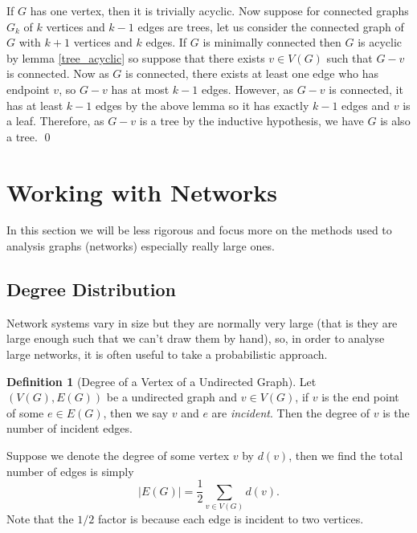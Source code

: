 \documentclass[
]{article}
\theoremstyle{definition}
\theoremstyle{definition}
\newtheorem{definition}{Definition}[section]
\begin{document}
If \(G\) has one vertex, then it is trivially acyclic. Now suppose for
connected graphs \(G_k\) of \(k\) vertices and \(k - 1\) edges are
trees, let us consider the connected graph of \(G\) with \(k + 1\)
vertices and \(k\) edges. If \(G\) is minimally connected then \(G\) is
acyclic by lemma \ref{tree_acyclic} so suppose that there exists
\(v \in V(G)\) such that \(G - v\) is connected. Now as \(G\) is
connected, there exists at least one edge who has endpoint \(v\), so
\(G - v\) has at most \(k - 1\) edges. However, as \(G - v\) is
connected, it has at least \(k - 1\) edges by the above lemma so it has
exactly \(k - 1\) edges and \(v\) is a leaf. Therefore, as \(G - v\) is
a tree by the inductive hypothesis, we have \(G\) is also a tree. \qed

\newpage

\hypertarget{working-with-networks}{%
\section{Working with Networks}\label{working-with-networks}}

In this section we will be less rigorous and focus more on the methods
used to analysis graphs (networks) especially really large ones.

\hypertarget{degree-distribution}{%
\subsection{Degree Distribution}\label{degree-distribution}}

Network systems vary in size but they are normally very large (that is
they are large enough such that we can't draw them by hand), so, in
order to analyse large networks, it is often useful to take a
probabilistic approach.

\begin{definition}[Degree of a Vertex of a Undirected Graph]
  Let \((V(G), E(G))\) be a undirected graph and \(v \in V(G)\), if \(v\) is the 
  end point of some \(e \in E(G)\), then we say \(v\) and \(e\) are 
  \textit{incident}. Then the degree of \(v\) is the number of incident edges.
\end{definition}

Suppose we denote the degree of some vertex \(v\) by \(d(v)\), then we
find the total number of edges is simply
\[ \left| E(G) \right| = \frac{1}{2} \sum_{v \in V(G)} d(v).\] Note that
the \(1 / 2\) factor is because each edge is incident to two vertices.
\end{document}
